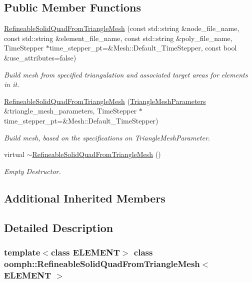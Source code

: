 \subsection*{Public Member Functions}
\begin{DoxyCompactItemize}
\item 
\hyperlink{classoomph_1_1RefineableSolidQuadFromTriangleMesh_add069deb878fe3142334acac0c2d86af}{Refineable\+Solid\+Quad\+From\+Triangle\+Mesh} (const std\+::string \&node\+\_\+file\+\_\+name, const std\+::string \&element\+\_\+file\+\_\+name, const std\+::string \&poly\+\_\+file\+\_\+name, Time\+Stepper $\ast$time\+\_\+stepper\+\_\+pt=\&Mesh\+::\+Default\+\_\+\+Time\+Stepper, const bool \&use\+\_\+attributes=false)
\begin{DoxyCompactList}\small\item\em Build mesh from specified triangulation and associated target areas for elements in it. \end{DoxyCompactList}\item 
\hyperlink{classoomph_1_1RefineableSolidQuadFromTriangleMesh_a2c73a5df8ad33217f0978417e9d6c690}{Refineable\+Solid\+Quad\+From\+Triangle\+Mesh} (\hyperlink{classoomph_1_1TriangleMeshParameters}{Triangle\+Mesh\+Parameters} \&triangle\+\_\+mesh\+\_\+parameters, Time\+Stepper $\ast$time\+\_\+stepper\+\_\+pt=\&Mesh\+::\+Default\+\_\+\+Time\+Stepper)
\begin{DoxyCompactList}\small\item\em Build mesh, based on the specifications on Triangle\+Mesh\+Parameter. \end{DoxyCompactList}\item 
virtual \hyperlink{classoomph_1_1RefineableSolidQuadFromTriangleMesh_a2b6bc173d4ef48f285f9cf7330db2878}{$\sim$\+Refineable\+Solid\+Quad\+From\+Triangle\+Mesh} ()
\begin{DoxyCompactList}\small\item\em Empty Destructor. \end{DoxyCompactList}\end{DoxyCompactItemize}
\subsection*{Additional Inherited Members}


\subsection{Detailed Description}
\subsubsection*{template$<$class E\+L\+E\+M\+E\+NT$>$\newline
class oomph\+::\+Refineable\+Solid\+Quad\+From\+Triangle\+Mesh$<$ E\+L\+E\+M\+E\+N\+T $>$}

